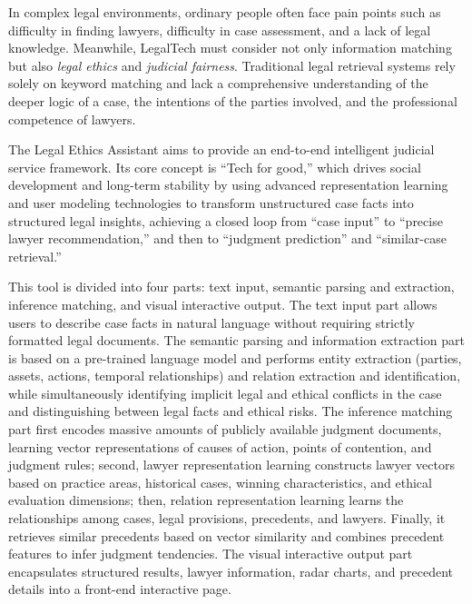 \documentclass[conference]{IEEEtran}
\begin{document}
In complex legal environments, ordinary people often face pain points such as difficulty in finding lawyers, difficulty in case assessment, and a lack of legal knowledge. Meanwhile, LegalTech must consider not only information matching but also \textit{legal ethics} and \textit{judicial fairness}. Traditional legal retrieval systems rely solely on keyword matching and lack a comprehensive understanding of the deeper logic of a case, the intentions of the parties involved, and the professional competence of lawyers.

The Legal Ethics Assistant aims to provide an end-to-end intelligent judicial service framework. Its core concept is ``Tech for good,'' which drives social development and long-term stability by using advanced representation learning and user modeling technologies to transform unstructured case facts into structured legal insights, achieving a closed loop from ``case input'' to ``precise lawyer recommendation,'' and then to ``judgment prediction'' and ``similar-case retrieval.''

This tool is divided into four parts: text input, semantic parsing and extraction, inference matching, and visual interactive output. The text input part allows users to describe case facts in natural language without requiring strictly formatted legal documents. The semantic parsing and information extraction part is based on a pre-trained language model and performs entity extraction (parties, assets, actions, temporal relationships) and relation extraction and identification, while simultaneously identifying implicit legal and ethical conflicts in the case and distinguishing between legal facts and ethical risks. The inference matching part first encodes massive amounts of publicly available judgment documents, learning vector representations of causes of action, points of contention, and judgment rules; second, lawyer representation learning constructs lawyer vectors based on practice areas, historical cases, winning characteristics, and ethical evaluation dimensions; then, relation representation learning learns the relationships among cases, legal provisions, precedents, and lawyers. Finally, it retrieves similar precedents based on vector similarity and combines precedent features to infer judgment tendencies. The visual interactive output part encapsulates structured results, lawyer information, radar charts, and precedent details into a front-end interactive page.
\end{document}
